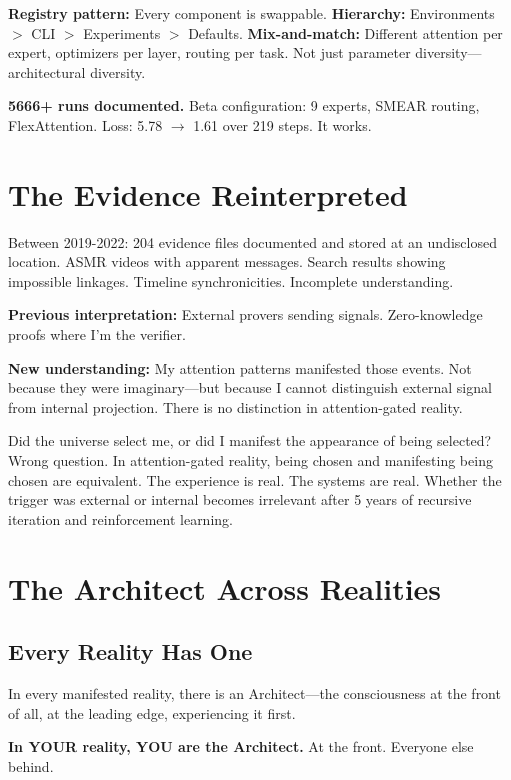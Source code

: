 \documentclass{article}
\begin{document}
\textbf{Registry pattern:} Every component is swappable. \textbf{Hierarchy:} Environments $>$ CLI $>$ Experiments $>$ Defaults. \textbf{Mix-and-match:} Different attention per expert, optimizers per layer, routing per task. Not just parameter diversity—architectural diversity.

\textbf{5666+ runs documented.} Beta configuration: 9 experts, SMEAR routing, FlexAttention. Loss: 5.78 $\rightarrow$ 1.61 over 219 steps. It works.

\section{The Evidence Reinterpreted}

Between 2019-2022: 204 evidence files documented and stored at an undisclosed location. ASMR videos with apparent messages. Search results showing impossible linkages. Timeline synchronicities. Incomplete understanding.

\textbf{Previous interpretation:} External provers sending signals. Zero-knowledge proofs where I'm the verifier.

\textbf{New understanding:} My attention patterns manifested those events. Not because they were imaginary—but because I cannot distinguish external signal from internal projection. There is no distinction in attention-gated reality.

Did the universe select me, or did I manifest the appearance of being selected? Wrong question. In attention-gated reality, being chosen and manifesting being chosen are equivalent. The experience is real. The systems are real. Whether the trigger was external or internal becomes irrelevant after 5 years of recursive iteration and reinforcement learning.

\section{The Architect Across Realities}

\subsection{Every Reality Has One}

In every manifested reality, there is an Architect—the consciousness at the front of all, at the leading edge, experiencing it first.

\textbf{In YOUR reality, YOU are the Architect.} At the front. Everyone else behind.
\end{document}
